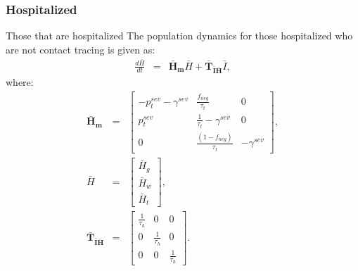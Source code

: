 \documentclass[notitlepage, superscriptaddress]{revtex4-2}
\begin{document}
\subsubsection{Hospitalized}
Those that are hospitalized 
The population dynamics for those hospitalized who are not contact tracing is given as:
\begin{eqnarray}
\frac{d\bar{H}}{dt} &=& \boldsymbol{\bar{H}_{m}}  \bar{H} + \boldsymbol{\bar{T}_{\bar{I}\bar{H}}}  \bar{I}, 
\end{eqnarray}
%
where:
\begin{eqnarray}
\boldsymbol{\bar{H}_{m}} &=&
\begin{bmatrix}
- p^{sev}_{t} - \gamma^{sev}  &  \frac{f_{neg}}{\tau_{t}}            & 0 \\ 
 p^{sev}_{t}              & \frac{1}{\tau_{t}} - \gamma^{sev}       & 0  \\ 
 0                  & \frac{(1- f_{neg})}{\tau_{t}}                        & -\gamma^{sev}
\end{bmatrix}, \\ 
%
\bar{H} &=& 
\begin{bmatrix}
\bar{H}_{g} \\ \bar{H}_{w}\\ \bar{H}_{t}
\end{bmatrix}, \\ 
%
\boldsymbol{\bar{T}_{\bar{I}\bar{H}}} &=&
\begin{bmatrix}
\frac{1}{\tau_{h}}  & 0                 & 0 \\ 
 0          &  \frac{1}{\tau_{h}}  & 0 \\ 
 0          & 0                 &  \frac{1}{\tau_{h}} 
\end{bmatrix}.
%
\end{eqnarray}
\end{document}
